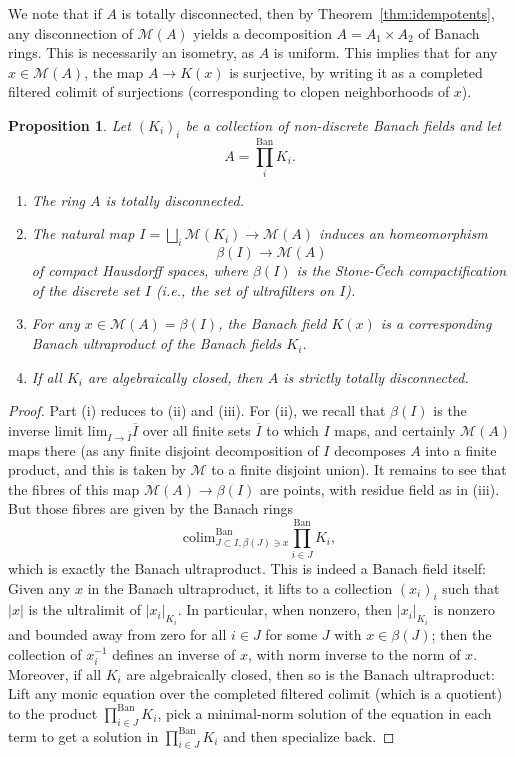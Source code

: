 \documentclass[11pt]{amsart}
\numberwithin{equation}{section}
\numberwithin{theorem}{section}
\newtheorem{proposition}[theorem]{Proposition}
\theoremstyle{definition}
\begin{document}
We note that if $A$ is totally disconnected, then by Theorem~\ref{thm:idempotents}, any disconnection of $\mathcal M(A)$ yields a decomposition $A=A_1\times A_2$ of Banach rings. This is necessarily an isometry, as $A$ is uniform. This implies that for any $x\in \mathcal M(A)$, the map $A\to K(x)$ is surjective, by writing it as a completed filtered colimit of surjections (corresponding to clopen neighborhoods of $x$).

\begin{proposition} Let $(K_i)_i$ be a collection of non-discrete Banach fields and let
\[
A=\prod_i^{\mathrm{Ban}} K_i.
\]
\begin{enumerate}
\item[{\rm (i)}] The ring $A$ is totally disconnected.
\item[{\rm (ii)}] The natural map $I=\bigsqcup_i \mathcal M(K_i)\to \mathcal M(A)$ induces an homeomorphism
\[
\beta(I)\to \mathcal M(A)
\]
of compact Hausdorff spaces, where $\beta(I)$ is the Stone-\v{C}ech compactification of the discrete set $I$ (i.e., the set of ultrafilters on $I$).
\item[{\rm (iii)}] For any $x\in \mathcal M(A)=\beta(I)$, the Banach field $K(x)$ is a corresponding Banach ultraproduct of the Banach fields $K_i$.
\item[{\rm (iv)}] If all $K_i$ are algebraically closed, then $A$ is strictly totally disconnected.
\end{enumerate}
\end{proposition}

\begin{proof} Part (i) reduces to (ii) and (iii). For (ii), we recall that $\beta(I)$ is the inverse limit $\mathrm{lim}_{I\to \overline{I}} \overline{I}$ over all finite sets $\overline{I}$ to which $I$ maps, and certainly $\mathcal M(A)$ maps there (as any finite disjoint decomposition of $I$ decomposes $A$ into a finite product, and this is taken by $\mathcal M$ to a finite disjoint union). It remains to see that the fibres of this map $\mathcal M(A)\to \beta(I)$ are points, with residue field as in (iii). But those fibres are given by the Banach rings
\[
\mathrm{colim}_{J\subset I, \beta(J)\ni x}^{\mathrm{Ban}} \prod_{i\in J}^{\mathrm{Ban}} K_i,
\]
which is exactly the Banach ultraproduct. This is indeed a Banach field itself: Given any $x$ in the Banach ultraproduct, it lifts to a collection $(x_i)_i$ such that $|x|$ is the ultralimit of $|x_i|_{K_i}$. In particular, when nonzero, then $|x_i|_{K_i}$ is nonzero and bounded away from zero for all $i\in J$ for some $J$ with $x\in \beta(J)$; then the collection of $x_i^{-1}$ defines an inverse of $x$, with norm inverse to the norm of $x$. Moreover, if all $K_i$ are algebraically closed, then so is the Banach ultraproduct: Lift any monic equation over the completed filtered colimit (which is a quotient) to the product $\prod_{i\in J}^{\mathrm{Ban}} K_i$, pick a minimal-norm solution of the equation in each term to get a solution in $\prod_{i\in J}^{\mathrm{Ban}} K_i$ and then specialize back.
\end{proof}
\end{document}
